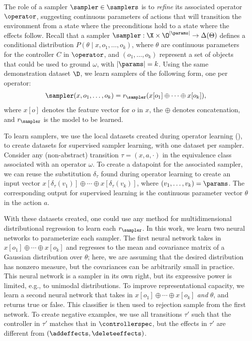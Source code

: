 The role of a sampler $\sampler \in \samplers$ is to \emph{refine} its associated operator $\operator$, suggesting continuous parameters of actions that will transition the environment from a state where the preconditions hold to a state where the effects follow.
Recall that a sampler $\sampler : \X \times \O^{|\params|} \to \Delta(\Theta)$ defines a conditional distribution $P(\theta \mid x, o_1, \dots, o_k)$, where $\theta$ are continuous parameters for the controller $C$ in $\operator$, and $(o_1, \ldots, o_k)$ represent a set of objects that could be used to ground $\omega$, with $|\params| = k$.
Using the same demonstration dataset $\D$, we learn samplers of the following form, one per operator: $$\sampler(x, o_1, \dots, o_k) = r_\sampler(x[o_1] \oplus \cdots \oplus x[o_k]),$$
where $x[o]$ denotes the feature vector for $o$ in $x$, the $\oplus$ denotes concatenation, and $r_\sampler$ is the model to be learned.

To learn samplers, we use the local datasets created during operator learning (), to create datasets for supervised sampler learning, with one dataset per sampler.
Consider any (non-abstract) transition $\tau = (x, a, \cdot)$ in the equivalence class associated with an operator $\omega$.
To create a datapoint for the associated sampler, we can reuse the substitution $\delta_\tau$ found during operator learning to create an input vector $x[\delta_\tau(v_1)] \oplus \cdots \oplus x[\delta_\tau(v_k)]$, where $(v_1, \dots, v_k) = \params$.
The corresponding output for supervised learning is the continuous parameter vector $\theta$ in the action $a$.

With these datasets created, one could use any method for multidimensional distributional regression to learn each $r_\sampler$.
In this work, we learn two neural networks to parameterize each sampler.
The first neural network takes in $x[o_1] \oplus \cdots \oplus x[o_k]$ and regresses to the mean and covariance matrix of a Gaussian distribution over $\theta$; here, we are assuming that the desired distribution has nonzero measure, but the covariances can be arbitrarily small in practice.
This neural network is a sampler in its own right, but its expressive power is limited, e.g., to unimodal distributions.
To improve representational capacity, we learn a second neural network that takes in $x[o_1] \oplus \cdots \oplus x[o_k]$ \emph{and} $\theta$, and returns true or false.
This classifier is then used to rejection sample from the first network.
To create negative examples, we use all transitions $\tau'$ such that the controller in $\tau'$ matches that in $\controllerspec$, but the effects in $\tau'$ are different from $(\addeffects, \deleteeffects)$.

